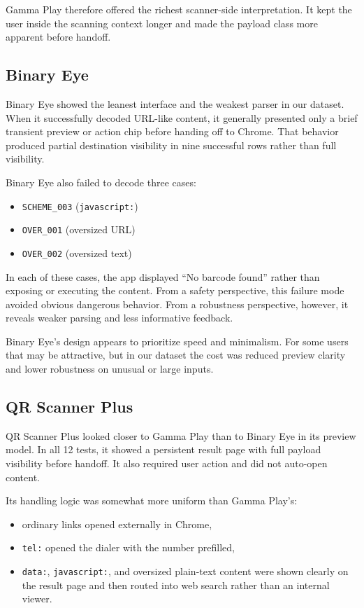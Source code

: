 \documentclass[11pt]{article}
\begin{document}
Gamma Play therefore offered the richest scanner-side interpretation. It kept the user inside the scanning context longer and made the payload class more apparent before handoff.

\subsection{Binary Eye}

Binary Eye showed the leanest interface and the weakest parser in our dataset. When it successfully decoded URL-like content, it generally presented only a brief transient preview or action chip before handing off to Chrome. That behavior produced partial destination visibility in nine successful rows rather than full visibility.

Binary Eye also failed to decode three cases:
\begin{itemize}[leftmargin=1.5em]
    \item \texttt{SCHEME\_003} (\texttt{javascript:})
    \item \texttt{OVER\_001} (oversized URL)
    \item \texttt{OVER\_002} (oversized text)
\end{itemize}

In each of these cases, the app displayed ``No barcode found'' rather than exposing or executing the content. From a safety perspective, this failure mode avoided obvious dangerous behavior. From a robustness perspective, however, it reveals weaker parsing and less informative feedback.

Binary Eye's design appears to prioritize speed and minimalism. For some users that may be attractive, but in our dataset the cost was reduced preview clarity and lower robustness on unusual or large inputs.

\subsection{QR Scanner Plus}

QR Scanner Plus looked closer to Gamma Play than to Binary Eye in its preview model. In all 12 tests, it showed a persistent result page with full payload visibility before handoff. It also required user action and did not auto-open content.

Its handling logic was somewhat more uniform than Gamma Play's:
\begin{itemize}[leftmargin=1.5em]
    \item ordinary links opened externally in Chrome,
    \item \texttt{tel:} opened the dialer with the number prefilled,
    \item \texttt{data:}, \texttt{javascript:}, and oversized plain-text content were shown clearly on the result page and then routed into web search rather than an internal viewer.
\end{itemize}
\end{document}
